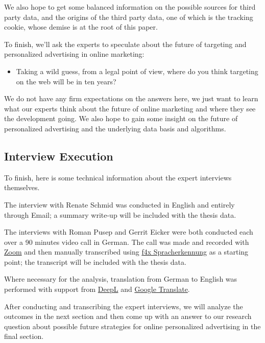 We also hope to get some balanced information on the possible sources for third party data, and the origins of the third party data, one of which is the tracking cookie, whose demise is at the root of this paper.

To finish, we'll ask the experts to speculate about the future of targeting and personalized advertising in online marketing:
 
\begin{itemize} 
 \item Taking a wild guess, from a legal point of view, where do you think targeting on the web will be in ten years?
\end{itemize}

We do not have any firm expectations on the answers here, we just want to learn what our experts think about the future of online marketing and where they see the development going. We also hope to gain some insight on the future of personalized advertising and the underlying data basis and algorithms.

\subsection{Interview Execution}

To finish, here is some technical information about the expert interviews themselves.

The interview with Renate Schmid was conducted in English and entirely through Email; a summary write-up will be included with the thesis data.

The interviews with Roman Pusep and Gerrit Eicker were both conducted each over a 90 minutes video call in German. The call was made and recorded with \href{https://zoom.us/}{Zoom} and then manually transcribed using \href{https://f4x.audiotranskription.de/}{f4x Spracherkennung} as a starting point; the transcript will be included with the thesis data.

Where necessary for the analysis, translation from German to English was performed with support from \href{https://www.deepl.com/en/translator}{DeepL} and \href{https://translate.google.de/}{Google Translate}.

After conducting and transcribing the expert interviews, we will analyze the outcomes in the next section and then come up with an answer to our research question about possible future strategies for online personalized advertising in the final section.

